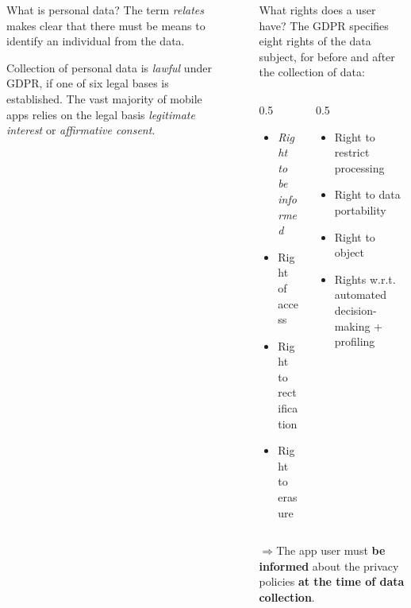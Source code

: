 \documentclass[final,noamsthm]{beamer}
\newlength{\sepwid}
\newlength{\onecolwid}
\begin{document}
\begin{frame}[t]
\begin{columns}[t]
\begin{column}{\onecolwid}
\begin{block}{What is personal data?}
			The term \textit{relates} makes clear that there must be means 
			to identify an individual from the data.
			
			Collection of personal data is \textit{lawful} under GDPR, if 
			one of six legal bases is established.
			The vast majority of mobile apps relies on the legal 
			basis
			\textit{legitimate interest} or \textit{affirmative 
			consent}.
		\end{block}
	\end{column}
	\begin{column}{\sepwid}\end{column} %
	
	\begin{column}{\onecolwid} %
		\begin{block}{What rights does a user have?}
			The GDPR specifies eight rights of the data subject, for
		 before and after the collection of data:
			\vspace{-0.5cm}
			\begin{columns}
				\begin{column}{0.5\textwidth}
					\begin{itemize}
						\small
						\item \textit{Right to be informed}
						\item Right of access
						\item Right to rectification
						\item Right to erasure
					\end{itemize}
				\end{column}
				\begin{column}{0.5\textwidth}
					\begin{itemize}
						\small
						\item Right to restrict processing
						\item Right to data portability
						\item Right to object
						\item Rights w.r.t. automated decision-making + 
						profiling
					\end{itemize}
				\end{column}
			\end{columns}
			\vspace{0.5cm}
			$\Rightarrow$The app user must \textbf{be informed} about the 
			privacy 
			policies \textbf{at 
				the time of data collection}.
		\end{block}
	\end{column}


\end{columns}
\end{frame}
\end{document}
